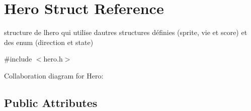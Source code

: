 \hypertarget{structHero}{}\section{Hero Struct Reference}
\label{structHero}


structure de l\textquotesingle{}hero qui utilise d\textquotesingle{}autres structures définies (sprite, vie et score) et des enum (direction et state)  




{\ttfamily \#include $<$hero.\+h$>$}



Collaboration diagram for Hero\+:
\subsection*{Public Attributes}
